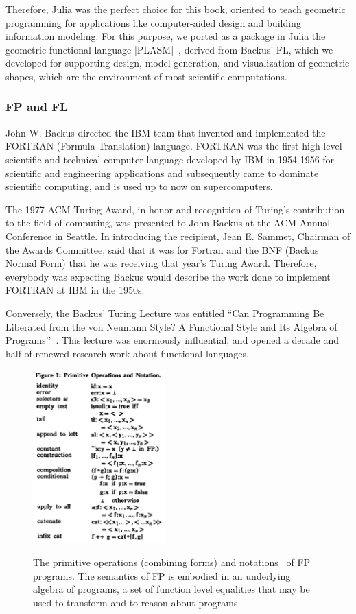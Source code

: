 Therefore, Julia was the perfect choice for this book, oriented to teach geometric programming for  applications like computer-aided design and building information modeling. For this purpose, we ported as a package in Julia the geometric functional language |PLASM|~\cite{Paoluzzi:1995:GPP:212332.212349,Paoluzzi2003a}, derived from Backus’ FL, which we developed for supporting design, model generation, and visualization of geometric shapes, which are the environment of most scientific computations.


\subsubsection*{FP and FL}

John W. Backus directed the IBM team that invented and implemented the FORTRAN (Formula Translation) language. FORTRAN was the first high-level scientific and technical computer language developed by IBM in 1954-1956 for scientific and engineering applications and subsequently came to dominate scientific computing, and is used up to now on supercomputers.

The 1977 ACM Turing Award, in honor and recognition of Turing’s contribution to the field of computing, was presented to John Backus at the ACM Annual Conference in Seattle. In introducing the recipient, Jean E. Sammet, Chairman of the Awards Committee, said that  
it was for Fortran and the BNF (Backus Normal Form) that he was receiving that year's Turing Award.
Therefore, everybody was expecting Backus would describe the  work done to implement FORTRAN at IBM in the 1950s.

Conversely, the Backus’ Turing Lecture was entitled ``Can Programming Be Liberated from the von Neumann Style? A Functional Style and Its Algebra of Programs’’~\cite{10.1145/359576.359579}. This lecture was enormously influential, and opened a decade and half of renewed research work about functional languages. 


\begin{figure}
\centering
   \includegraphics[width=2in]{chapter-01/figs/FP.pdf} \hfill~
\caption{The primitive operations (combining forms) and notations~\cite{10.1145/73560.73575} of FP programs. The semantics of FP is embodied in an underlying algebra of programs, a set of function level equalities that may be used to transform and to reason about programs.}
\label{fig:1:FP}
\end{figure}


